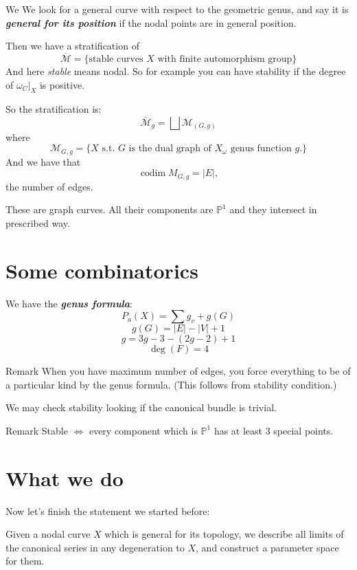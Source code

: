We 
We look for a general curve with respect to the geometric genus, and say it is \textit{\textbf{general for its position}} if the nodal points are in general position.

Then we have a stratification of 
\[\overline{\mathcal{M}}=\{\text{stable curves } X \text{ with finite automorphism group}  \}\]
And here \textit{stable} means nodal. So for example you can have stability if the degree of $\omega_C|_{X}$ is positive.

So the stratification is:
\[\overline{\mathcal{M}}_{g}=\bigsqcup \mathcal{M}_{(G,g)}\]
where
\[\mathcal{M}_{G,g}=\{X\text{ s.t. $G$ is the dual graph of $X_\omega$ genus function $g$.} \}\]
And we have that
\[ \operatorname{codim}M_{G,g}=|E|,\]
the number of edges.

\begin{remark}
	These are graph curves. All their components are $\mathbb{P}^1$ and they intersect in prescribed way.
\end{remark}

\section{Some combinatorics}

We have the \textit{\textbf{genus formula}}:
 \[P_a(X)=\sum g_v+g(G)\]
\[g(G)=|E|-|V| +1\]
\[g=3g-3-(2g-2)+1\]
\[\operatorname{deg}(F)=4\]

\begin{idea6}{Remark}\leavevmode
When you have maximum number of edges, you force everything to be of a particular kind by the genus formula. (This follows from stability condition.)
\end{idea6}

\begin{remark}
	We may check stability looking if the canonical bundle is trivial.
\end{remark}

\begin{idea1}{Remark}\leavevmode
	Stable $\iff$ every component which is $\mathbb{P}^1$ has at least 3 special points.
\end{idea1}

\section{What we do}

Now let's finish the statement we started before:

Given a nodal curve $X$ which is general for its topology, we describe all limits of the canonical series in any degeneration to $X$, and construct a parameter space for them.


